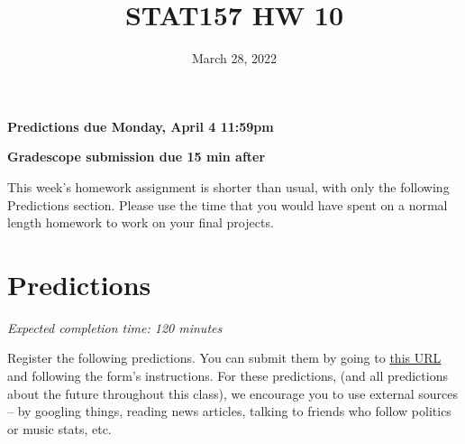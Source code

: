 \documentclass[11pt]{article}
\title{STAT157 HW 10}
\date{March 28, 2022}
\begin{document}
\maketitle

\hfill \textbf{Predictions due Monday, April 4 11:59pm}

\hfill \textbf{Gradescope submission due 15 min after}


This week's homework assignment is shorter than usual, with only the following Predictions section. Please use the time that you would have spent on a normal length homework to work on your final projects.


\section*{Predictions}

\emph{Expected completion time: 120 minutes}

Register the following predictions. You can submit them by going to \href{https://docs.google.com/forms/d/e/1FAIpQLSeAvSCrPasO4gNeqa_SrJIrslxGWjF-MRO8UQvhh9Gx3-JA_A/viewform?usp=sf_link}{this URL} and following the form's instructions. For these predictions, (and all predictions about the future throughout this class), we encourage you to use external sources -- by googling things, reading news articles, talking to friends who follow politics or music stats, etc.
\end{document}
